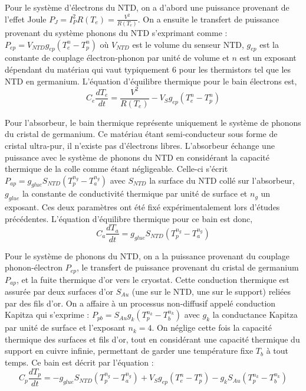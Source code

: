 Pour le système d'électrons du NTD, on a d'abord une puissance provenant de l'effet Joule $P_J= I_P^2 R(T_e)=\frac{V^2}{R(T_e)}$. On a ensuite le transfert de puissance provenant du système phonons du NTD s'exprimant comme : $P_{ep}=V_{NTD} g_{ep} (T_e^n - T_p^n)$ où $V_{NTD}$ est le volume du senseur NTD, $g_{ep}$ est la constante de couplage électron-phonon par unité de volume et $n$ est un exposant dépendant du matériau qui vaut typiquement 6 pour les thermistors tel que les NTD en germanium. L'équation d'équilibre thermique pour le bain électrons est,
\begin{equation}
\label{electron}
 C_e \frac{d T_e}{d t} = \frac{V^2}{R(T_e)} - V_S g_{ep} \left( T_e^{n} - T_p^{n} \right)
\end{equation}

Pour l'absorbeur, le bain thermique représente uniquement le système de phonons du cristal de germanium. Ce matériau étant semi-conducteur sous forme de cristal ultra-pur, il n'existe pas d'électrons libres. L'absorbeur échange une puissance  avec le système de phonons du NTD en considérant la capacité thermique de la colle comme étant négligeable. Celle-ci s'écrit $P_{ap}=g_{glue} S_{NTD} \left( T_p^{n_g} - T_a^{n_g} \right)$ avec $S_{NTD}$ la surface du NTD collé sur l'absorbeur, $g_{glue}$ la constante de conductivité thermique par unité de surface et $n_g$ un exposant. Ces deux paramètres ont été fixé expérimentalement lors d'études précédentes. L'équation d'équilibre thermique pour ce bain est donc,
\begin{equation}
\label{absorbeur}
C_a \frac{d T_a}{d t} = g_{glue} S_{NTD} \left( T_p^{n_g} - T_a^{n_g} \right)
\end{equation}


Pour le système de phonons du NTD, on a la puissance provenant du couplage phonon-électron $P_{ep}$, le transfert de puissance provenant du cristal de germanium $P_{ap}$, et la fuite thermique d'or vers le cryostat. Cette conduction thermique est assurée par deux surfaces d'or $S_{Au}$ (une sur le NTD, une sur le support) reliées par des fils d'or. On a affaire à un processus non-diffusif appelé conduction Kapitza qui s'exprime : $P_{pb}=S_{Au} g_k (T_p^{n_k} - T_b^{n_k})$ avec $g_k$ la conductance Kapitza par unité de surface et l'exposant $n_k=4$. On néglige cette fois la capacité thermique des surfaces et fils d'or, tout en considérant une capacité thermique du support en cuivre infinie, permettant de garder une température fixe $T_b$ à tout temps.
Ce bain est décrit par l'équation :
\begin{equation}
\label{phonon}
C_p \frac{d T_p}{d t} = -g_{glue} S_{NTD} \left( T_p^{n_g} - T_a^{n_g} \right)  + V_S g_{ep} \left( T_e^{n} - T_p^{n} \right) - g_k S_{Au} \left( T_p^{n_k} - T_b^{n_k} \right)
\end{equation}

